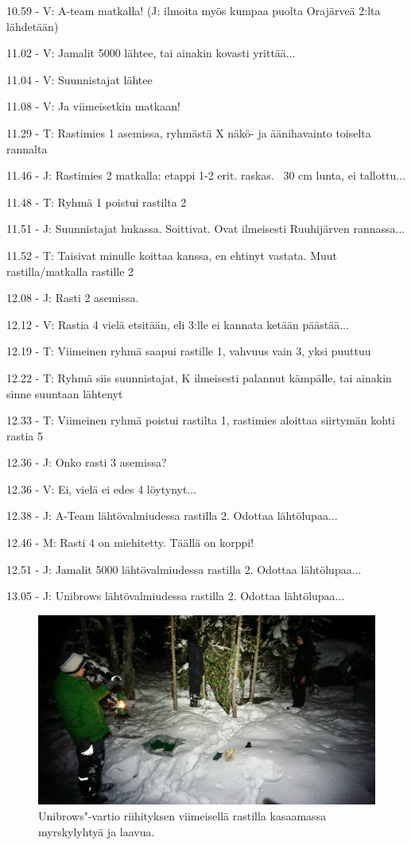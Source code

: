 \begin{multicols}{2}
\setlength{\parindent}{0em} 10.59 - V: A-team matkalla! (J: ilmoita myös 
kumpaa puolta Orajärveä 2:lta lähdetään)

11.02 - V: Jamalit 5000 lähtee, tai ainakin kovasti yrittää...

11.04 - V: Suunnistajat lähtee

11.08 - V: Ja viimeisetkin matkaan!

11.29 - T: Rastimies 1 asemissa, ryhmästä X näkö- ja äänihavainto 
toiselta rannalta

11.46 - J: Rastimies 2 matkalla: etappi 1-2 erit. raskas. ~30 cm lunta, ei 
tallottu...

11.48 - T: Ryhmä 1 poistui rastilta 2

11.51 - J: Suunnistajat hukassa. Soittivat. Ovat ilmeisesti Ruuhijärven 
rannassa...

11.52 - T: Taisivat minulle koittaa kanssa, en ehtinyt vastata. Muut 
rastilla/matkalla rastille 2

12.08 - J: Rasti 2 asemissa.

12.12 - V: Rastia 4 vielä etsitään, eli 3:lle ei kannata ketään 
päästää...

12.19 - T: Viimeinen ryhmä saapui rastille 1, vahvuus vain 3, yksi puuttuu

12.22 - T: Ryhmä siis suunnistajat, K ilmeisesti palannut kämpälle, tai 
ainakin sinne suuntaan lähtenyt

12.33 - T: Viimeinen ryhmä poistui rastilta 1, rastimies aloittaa siirtymän 
kohti rastia 5

12.36 - J: Onko rasti 3 asemissa?

12.36 - V: Ei, vielä ei edes 4 löytynyt...

12.38 - J: A-Team lähtövalmiudessa rastilla 2. Odottaa lähtölupaa...

12.46 - M: Rasti 4 on miehitetty. Täällä on korppi!

12.51 - J: Jamalit 5000 lähtövalmiudessa rastilla 2. Odottaa lähtölupaa...

13.05 - J: Unibrows lähtövalmiudessa rastilla 2. Odottaa lähtölupaa...

\begin{figure}[!t]
\centering\includegraphics[width=\textwidth,trim={0 0 0 .15cm},clip]{assets/riihitys2018}
\caption{Unibrows"-vartio riihityksen viimeisellä rastilla kasaamassa myrskylyhtyä ja 
laavua.}
\end{figure}


\end{multicols}
